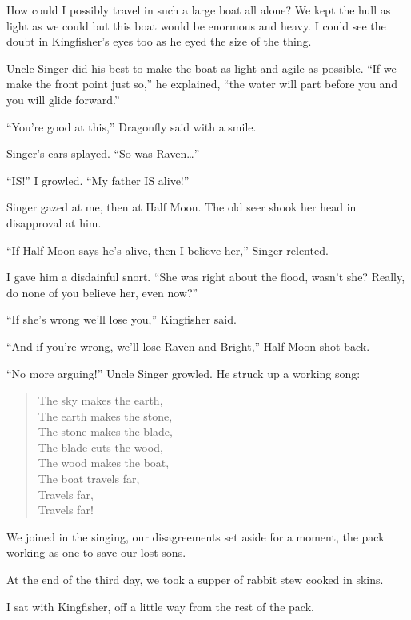 How could I possibly travel in such a large boat all alone? We kept the hull as light as we could but this boat would be enormous and heavy. I could see the doubt in Kingfisher's eyes too as he eyed the size of the thing.

Uncle Singer did his best to make the boat as light and agile as possible. ``If we make the front point just so,'' he explained, ``the water will part before you and you will glide forward.''

``You're good at this,'' Dragonfly said with a smile.

Singer's ears splayed. ``So was Raven\ldots''

``IS!'' I growled. ``My father IS alive!''

Singer gazed at me, then at Half Moon. The old seer shook her head in disapproval at him.

``If Half Moon says he's alive, then I believe her,'' Singer relented.

I gave him a disdainful snort. ``She was right about the flood, wasn't she? Really, do none of you believe her, even now?''

``If she's wrong we'll lose you,'' Kingfisher said.

``And if you're wrong, we'll lose Raven and Bright,'' Half Moon shot back.

``No more arguing!'' Uncle Singer growled. He struck up a working song:
\vspace{-0.5em}

\begin{verse}
The sky makes the earth, \\
The earth makes the stone, \\
The stone makes the blade, \\
The blade cuts the wood, \\
The wood makes the boat, \\
The boat travels far, \\
Travels far, \\
Travels far!
\end{verse}

\vspace{-0.5em}
We joined in the singing, our disagreements set aside for a moment, the pack working as one to save our lost sons.

\secdiv

\noindent At the end of the third day, we took a supper of rabbit stew cooked in skins.

I sat with Kingfisher, off a little way from the rest of the pack.

